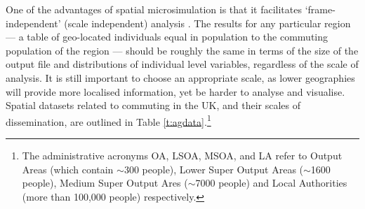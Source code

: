 \documentclass[a4paper, 11pt, twoside]{Thesis}
\begin{document}
One of the advantages of spatial microsimulation is that it facilitates
`frame-independent' (scale independent) analysis \citep{Horner2002}. The
results for any particular region --- a table of geo-located individuals equal
in population to the commuting population of the region --- should be roughly
the same in terms of the size of the output file and distributions of
individual level variables, regardless of the scale of analysis. It is
still important to choose an appropriate scale, as lower
geographies will provide more localised information, yet be harder
to analyse and visualise. 
Spatial datasets related to commuting in the UK, and their scales of
dissemination, are outlined
in Table \ref{t:agdata}.\footnote{The administrative acronyms OA, LSOA,
MSOA, and LA refer to Output Areas (which contain $\sim$300 people),
Lower Super Output Areas ($\sim$1600 people), Medium Super Output Ares
($\sim$7000 people) and Local Authorities (more than 100,000 people)
respectively.}
\end{document}
